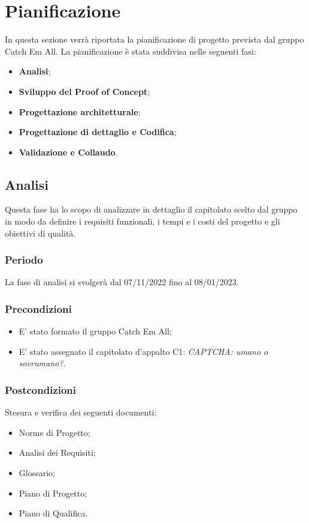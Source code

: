 \section{Pianificazione}
In questa sezione verrà riportata la pianificazione di progetto prevista dal gruppo Catch Em All. La pianificazione è stata suddivisa nelle seguenti fasi:
\begin{itemize}
	\item \textbf{Analisi};
	\item \textbf{Sviluppo del Proof of Concept};
	\item \textbf{Progettazione architetturale};
    \item \textbf{Progettazione di dettaglio e Codifica};
	\item \textbf{Validazione e Collaudo}.
\end{itemize}

\subsection{Analisi}
Questa fase ha lo scopo di analizzare in dettaglio il capitolato scelto dal gruppo in modo da definire i requisiti funzionali, i tempi e i costi del progetto e gli obiettivi di qualità.

\subsubsection{Periodo}
La fase di analisi si svolgerà dal 07/11/2022 fino al 08/01/2023.

\subsubsection{Precondizioni}
\begin{itemize}
	\item E’ stato formato il gruppo Catch Em All;
	\item E’ stato assegnato il capitolato d’appalto C1: \textit{\textit{CA}PTCHA: umano o sovrumano?}.
\end{itemize}

\subsubsection{Postcondizioni}
Stesura e verifica dei seguenti documenti:
\begin{itemize}
	\item Norme di Progetto;
	\item Analisi dei Requisiti;
	\item Glossario;
    \item Piano di Progetto;
	\item Piano di Qualifica.
\end{itemize}

